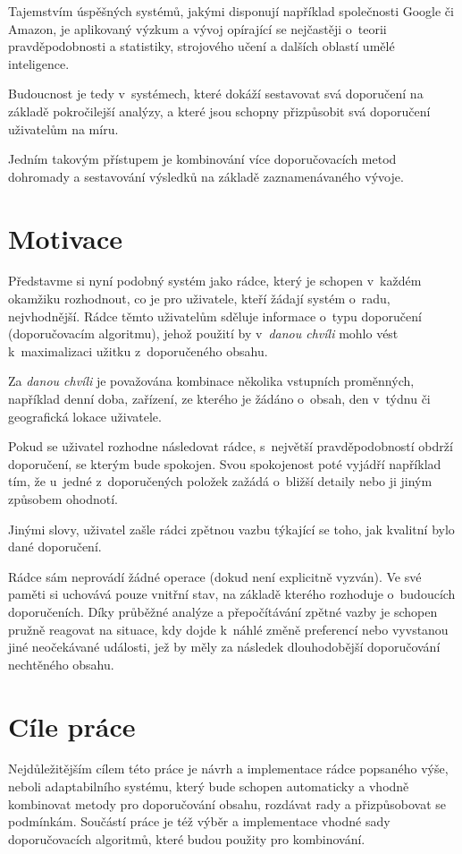 \documentclass[thesis=M,czech]{FITthesis}[2014/05/07]
\begin{document}
\begin{introduction}
	Tajemstvím úspěšných systémů, jakými disponují například společnosti Google či Amazon, je aplikovaný výzkum a vývoj opírající se nejčastěji o~teorii pravděpodobnosti a statistiky, strojového učení a dalších oblastí umělé inteligence.

	Budoucnost je tedy v~systémech, které dokáží sestavovat svá doporučení na základě pokročilejší analýzy, a které jsou schopny přizpůsobit svá doporučení uživatelům na míru.
	
	Jedním takovým přístupem je kombinování více doporučovacích metod dohromady a sestavování výsledků na základě zaznamenávaného vývoje.

\section{Motivace} 	
\label{sec:motivation}
	Představme si nyní podobný systém jako rádce, který je schopen v~každém okamžiku rozhodnout, co je pro uživatele, kteří žádají systém o~radu, nejvhodnější. Rádce těmto uživatelům sděluje informace o~typu doporučení (doporučovacím algoritmu), jehož použití by v~\emph{danou chvíli} mohlo vést k~maximalizaci užitku z~doporučeného obsahu.
	
	Za \emph{danou chvíli} je považována kombinace několika vstupních proměnných, například denní doba, zařízení, ze kterého je žádáno o~obsah, den v~týdnu či geografická lokace uživatele.
	
	Pokud se uživatel rozhodne následovat rádce, s~největší pravděpodobností obdrží doporučení, se kterým bude spokojen. Svou spokojenost poté vyjádří například tím, že u~jedné z~doporučených položek zažádá o~bližší detaily nebo ji jiným způsobem ohodnotí. 
	
	Jinými slovy, uživatel zašle rádci zpětnou vazbu týkající se toho, jak kvalitní bylo dané doporučení.
	
	Rádce sám neprovádí žádné operace (dokud není explicitně vyzván). Ve své paměti si uchovává pouze vnitřní stav, na základě kterého rozhoduje o~budoucích doporučeních. Díky průběžné analýze a přepočítávání zpětné vazby je schopen pružně reagovat na situace, kdy dojde k~náhlé změně preferencí nebo vyvstanou jiné neočekávané události, jež by měly za následek dlouhodobější doporučování nechtěného obsahu.
	
\section{Cíle práce}
\label{sec:objectives}
	Nejdůležitějším cílem této práce je návrh a implementace rádce popsaného výše, neboli adaptabilního systému, který bude schopen automaticky a vhodně kombinovat metody pro doporučování obsahu, rozdávat rady a přizpůsobovat se podmínkám. Součástí práce je též výběr a implementace vhodné sady doporučovacích algoritmů, které budou použity pro kombinování.


\end{introduction}
\end{document}
